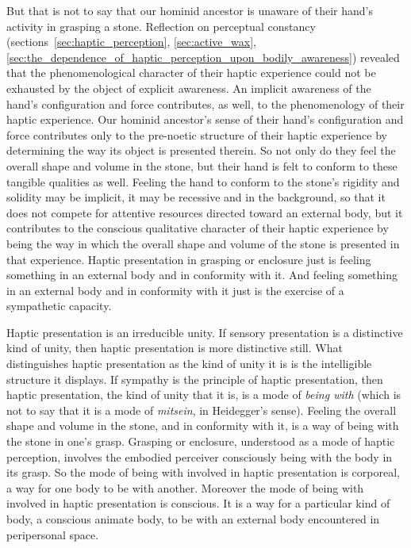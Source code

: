 But that is not to say that our hominid ancestor is unaware of their hand's activity in grasping a stone. Reflection on perceptual constancy (sections~\ref{sec:haptic_perception}, \ref{sec:active_wax}, \ref{sec:the_dependence_of_haptic_perception_upon_bodily_awareness}) revealed that the phenomenological character of their haptic experience could not be exhausted by the object of explicit awareness. An implicit awareness of the hand's configuration and force contributes, as well, to the phenomenology of their haptic experience. Our hominid ancestor's sense of their hand’s configuration and force contributes only to the pre-noetic structure of their haptic experience by determining the way its object is presented therein. So not only do they feel the overall shape and volume in the stone, but their hand is felt to conform to these tangible qualities as well. Feeling the hand to conform to the stone's rigidity and solidity may be implicit, it may be recessive and in the background, so that it does not compete for attentive resources directed toward an external body, but it contributes to the conscious qualitative character of their haptic experience by being the way in which the overall shape and volume of the stone is presented in that experience. Haptic presentation in grasping or enclosure just is feeling something in an external body and in conformity with it. And feeling something in an external body and in conformity with it just is the exercise of a sympathetic capacity.

Haptic presentation is an irreducible unity. If sensory presentation is a distinctive kind of unity, then haptic presentation is more distinctive still. What distinguishes haptic presentation as the kind of unity it is is the intelligible structure it displays. If sympathy is the principle of haptic presentation, then haptic presentation, the kind of unity that it is, is a mode of \emph{being with} (which is not to say that it is a mode of \emph{mitsein}, in Heidegger's sense). Feeling the overall shape and volume in the stone, and in conformity with it, is a way of being with the stone in one's grasp. Grasping or enclosure, understood as a mode of haptic perception, involves the embodied perceiver consciously being with the body in its grasp. So the mode of being with involved in haptic presentation is corporeal, a way for one body to be with another. Moreover the mode of being with involved in haptic presentation is conscious. It is a way for a particular kind of body, a conscious animate body, to be with an external body encountered in peripersonal space.

